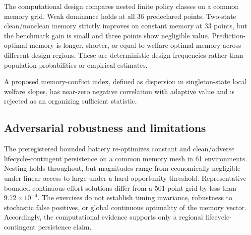The computational design compares nested finite policy classes on a common memory grid. Weak dominance holds at all 36 predeclared points. Two-state clean/nonclean memory strictly improves on constant memory at 33 points, but the benchmark gain is small and three points show negligible value. Prediction-optimal memory is longer, shorter, or equal to welfare-optimal memory across different design regions. These are deterministic design frequencies rather than population probabilities or empirical estimates.

A proposed memory-conflict index, defined as dispersion in singleton-state local welfare slopes, has near-zero negative correlation with adaptive value and is rejected as an organizing sufficient statistic.
\subsection{Adversarial robustness and limitations}
The preregistered bounded battery re-optimizes constant and clean/adverse lifecycle-contingent persistence on a common memory mesh in 61 environments. Nesting holds throughout, but magnitudes range from economically negligible under linear access to large under a hard opportunity threshold. Representative bounded continuous effort solutions differ from a 501-point grid by less than $9.72\times10^{-4}$. The exercises do not establish timing invariance, robustness to stochastic false positives, or global continuous optimality of the memory vector. Accordingly, the computational evidence supports only a regional lifecycle-contingent persistence claim.
